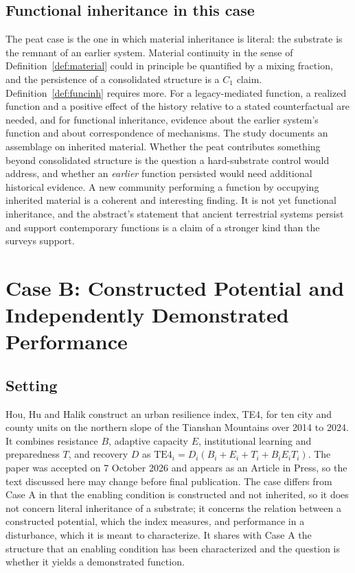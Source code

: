 \documentclass[11pt]{article}
\theoremstyle{definition}
\theoremstyle{remark}
\begin{document}
\subsection{Functional inheritance in this case}

The peat case is the one in which material inheritance is literal: the substrate is the remnant of an earlier system. Material continuity in the sense of Definition~\ref{def:material} could in principle be quantified by a mixing fraction, and the persistence of a consolidated structure is a $C_1$ claim. Definition~\ref{def:funcinh} requires more. For a legacy-mediated function, a realized function and a positive effect of the history relative to a stated counterfactual are needed, and for functional inheritance, evidence about the earlier system's function and about correspondence of mechanisms. The study documents an assemblage on inherited material. Whether the peat contributes something beyond consolidated structure is the question a hard-substrate control would address, and whether an \emph{earlier} function persisted would need additional historical evidence. A new community performing a function by occupying inherited material is a coherent and interesting finding. It is not yet functional inheritance, and the abstract's statement that ancient terrestrial systems persist and support contemporary functions is a claim of a stronger kind than the surveys support.

\section{Case B: Constructed Potential and Independently Demonstrated Performance}

\subsection{Setting}

Hou, Hu and Halik \cite{hou2026} construct an urban resilience index, TE4, for ten city and county units on the northern slope of the Tianshan Mountains over 2014 to 2024. It combines resistance $B$, adaptive capacity $E$, institutional learning and preparedness $T$, and recovery $D$ as $\mathrm{TE4}_i=D_i(B_i+E_i+T_i+B_iE_iT_i)$. The paper was accepted on 7 October 2026 and appears as an Article in Press, so the text discussed here may change before final publication. The case differs from Case A in that the enabling condition is constructed and not inherited, so it does not concern literal inheritance of a substrate; it concerns the relation between a constructed potential, which the index measures, and performance in a disturbance, which it is meant to characterize. It shares with Case A the structure that an enabling condition has been characterized and the question is whether it yields a demonstrated function.
\end{document}

